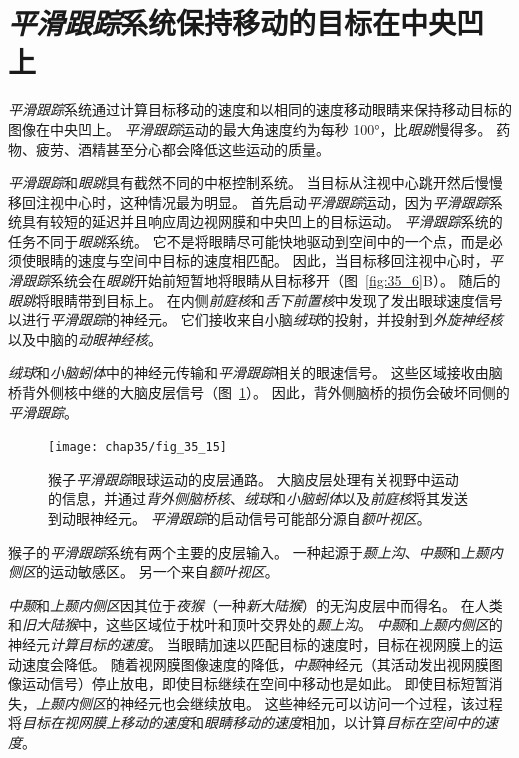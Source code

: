 \section{\textit{平滑跟踪}系统保持移动的目标在中央凹上}

\textit{平滑跟踪}系统通过计算目标移动的速度和以相同的速度移动眼睛来保持移动目标的图像在中央凹上。
\textit{平滑跟踪}运动的最大角速度约为每秒 100°，比\textit{眼跳}慢得多。
药物、疲劳、酒精甚至分心都会降低这些运动的质量。


\textit{平滑跟踪}和\textit{眼跳}具有截然不同的中枢控制系统。
当目标从注视中心跳开然后慢慢移回注视中心时，这种情况最为明显。
首先启动\textit{平滑跟踪}运动，因为\textit{平滑跟踪}系统具有较短的延迟并且响应周边视网膜和中央凹上的目标运动。
\textit{平滑跟踪}系统的任务不同于\textit{眼跳}系统。
它不是将眼睛尽可能快地驱动到空间中的一个点，而是必须使眼睛的速度与空间中目标的速度相匹配。
因此，当目标移回注视中心时，\textit{平滑跟踪}系统会在\textit{眼跳}开始前短暂地将眼睛从目标移开（图~\ref{fig:35_6}B）。
随后的\textit{眼跳}将眼睛带到目标上。
在内侧\textit{前庭核}和\textit{舌下前置核}中发现了发出眼球速度信号以进行\textit{平滑跟踪}的神经元。
它们接收来自小脑\textit{绒球}的投射，并投射到\textit{外旋神经核}以及中脑的\textit{动眼神经核}。


\textit{绒球}和\textit{小脑蚓体}中的神经元传输和\textit{平滑跟踪}相关的眼速信号。
这些区域接收由脑桥背外侧核中继的大脑皮层信号（图~\ref{fig:35_15}）。
因此，背外侧脑桥的损伤会破坏同侧的\textit{平滑跟踪}。


\begin{figure}[htbp]
	\centering
	\texttt{[image: chap35/fig\_35\_15]}
	\caption{猴子\textit{平滑跟踪}眼球运动的皮层通路。
		大脑皮层处理有关视野中运动的信息，并通过\textit{背外侧脑桥核}、\textit{绒球}和\textit{小脑蚓体}以及\textit{前庭核}将其发送到动眼神经元。
		\textit{平滑跟踪}的启动信号可能部分源自\textit{额叶视区}。}
	\label{fig:35_15}
\end{figure}


猴子的\textit{平滑跟踪}系统有两个主要的皮层输入。
一种起源于\textit{颞上沟}、\textit{中颞}和\textit{上颞内侧区}的运动敏感区。
另一个来自\textit{额叶视区}。


\textit{中颞}和\textit{上颞内侧区}因其位于\textit{夜猴}（一种\textit{新大陆猴}）的无沟皮层中而得名。
在人类和\textit{旧大陆猴}中，这些区域位于枕叶和顶叶交界处的\textit{颞上沟}。
\textit{中颞}和\textit{上颞内侧区}的神经元\textit{计算目标的速度}。
当眼睛加速以匹配目标的速度时，目标在视网膜上的运动速度会降低。
随着视网膜图像速度的降低，\textit{中颞}神经元（其活动发出视网膜图像运动信号）停止放电，即使目标继续在空间中移动也是如此。
即使目标短暂消失，\textit{上颞内侧区}的神经元也会继续放电。
这些神经元可以访问一个过程，该过程将\textit{目标在视网膜上移动的速度}和\textit{眼睛移动的速度}相加，以计算\textit{目标在空间中的速度}。


